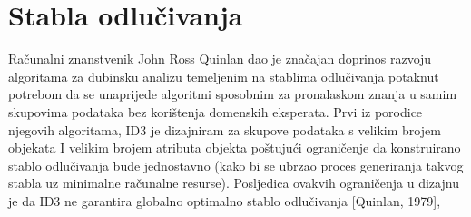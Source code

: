 \section{Stabla odlučivanja}
\label{ch:ch3}

Računalni znanstvenik John Ross Quinlan dao je značajan doprinos razvoju algoritama za dubinsku analizu temeljenim na stablima odlučivanja potaknut potrebom da se unaprijede algoritmi sposobnim za pronalaskom znanja u samim skupovima podataka bez korištenja domenskih eksperata. Prvi iz porodice njegovih algoritama, ID3 je dizajniram za skupove podataka s velikim brojem objekata I velikim brojem atributa objekta poštujući ograničenje da konstruirano stablo odlučivanja bude jednostavno (kako bi se ubrzao proces generiranja takvog stabla uz minimalne računalne resurse). Posljedica ovakvih ograničenja u dizajnu je da ID3 ne garantira globalno optimalno stablo odlučivanja [Quinlan, 1979], \cite{Quinlan02}
